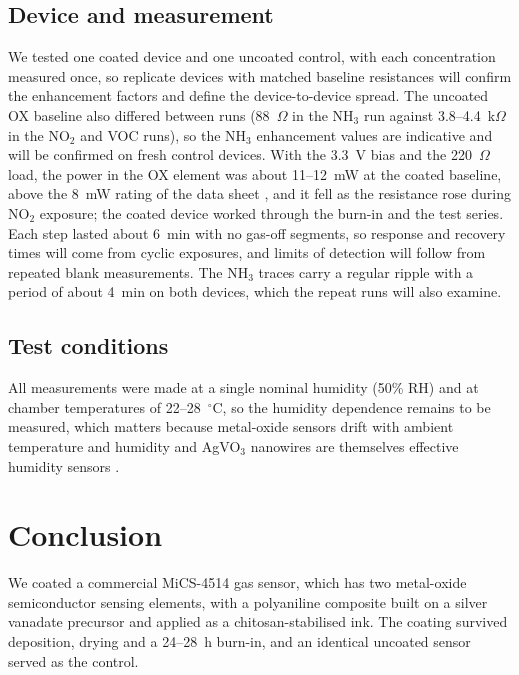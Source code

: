 \documentclass[preprint,11pt]{elsarticle}
\begin{document}
\subsection{Device and measurement}
We tested one coated device and one uncoated control, with each concentration measured once, so replicate devices with matched baseline resistances will confirm the enhancement factors and define the device-to-device spread. The uncoated OX baseline also differed between runs (88~$\Omega$ in the NH$_3$ run against 3.8--4.4~k$\Omega$ in the NO$_2$ and VOC runs), so the NH$_3$ enhancement values are indicative and will be confirmed on fresh control devices. With the 3.3~V bias and the 220~$\Omega$ load, the power in the OX element was about 11--12~mW at the coated baseline, above the 8~mW rating of the data sheet \cite{sgx2019mics4514}, and it fell as the resistance rose during NO$_2$ exposure; the coated device worked through the burn-in and the test series. Each step lasted about 6~min with no gas-off segments, so response and recovery times will come from cyclic exposures, and limits of detection will follow from repeated blank measurements. The NH$_3$ traces carry a regular ripple with a period of about 4~min on both devices, which the repeat runs will also examine.

\subsection{Test conditions}
All measurements were made at a single nominal humidity (50\% RH) and at chamber temperatures of 22--28~$^{\circ}$C, so the humidity dependence remains to be measured, which matters because metal-oxide sensors drift with ambient temperature and humidity \cite{abdullah2022drift} and AgVO$_3$ nanowires are themselves effective humidity sensors \cite{yan2023agvo3breath}.

\section{Conclusion}
\label{sec:conclusion}
We coated a commercial MiCS-4514 gas sensor, which has two metal-oxide semiconductor sensing elements, with a polyaniline composite built on a silver vanadate precursor and applied as a chitosan-stabilised ink. The coating survived deposition, drying and a 24--28~h burn-in, and an identical uncoated sensor served as the control.
\end{document}
